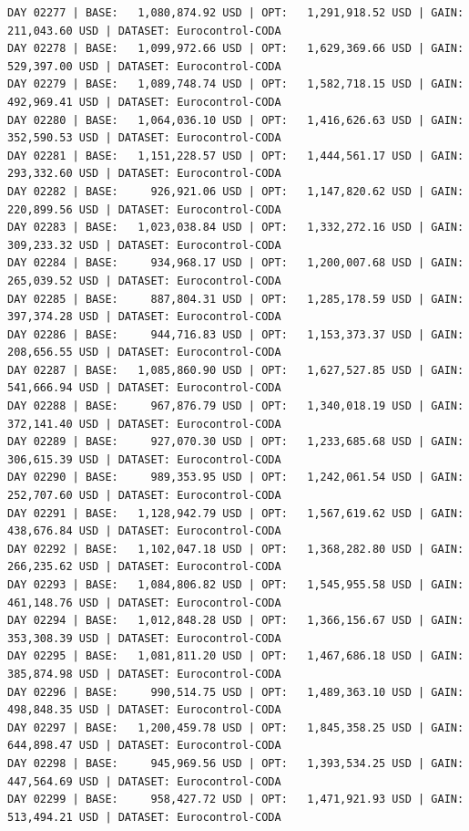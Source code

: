 \documentclass[11pt,a4paper]{article}
\begin{document}
\begin{verbatim}
DAY 02277 | BASE:   1,080,874.92 USD | OPT:   1,291,918.52 USD | GAIN: 211,043.60 USD | DATASET: Eurocontrol-CODA
DAY 02278 | BASE:   1,099,972.66 USD | OPT:   1,629,369.66 USD | GAIN: 529,397.00 USD | DATASET: Eurocontrol-CODA
DAY 02279 | BASE:   1,089,748.74 USD | OPT:   1,582,718.15 USD | GAIN: 492,969.41 USD | DATASET: Eurocontrol-CODA
DAY 02280 | BASE:   1,064,036.10 USD | OPT:   1,416,626.63 USD | GAIN: 352,590.53 USD | DATASET: Eurocontrol-CODA
DAY 02281 | BASE:   1,151,228.57 USD | OPT:   1,444,561.17 USD | GAIN: 293,332.60 USD | DATASET: Eurocontrol-CODA
DAY 02282 | BASE:     926,921.06 USD | OPT:   1,147,820.62 USD | GAIN: 220,899.56 USD | DATASET: Eurocontrol-CODA
DAY 02283 | BASE:   1,023,038.84 USD | OPT:   1,332,272.16 USD | GAIN: 309,233.32 USD | DATASET: Eurocontrol-CODA
DAY 02284 | BASE:     934,968.17 USD | OPT:   1,200,007.68 USD | GAIN: 265,039.52 USD | DATASET: Eurocontrol-CODA
DAY 02285 | BASE:     887,804.31 USD | OPT:   1,285,178.59 USD | GAIN: 397,374.28 USD | DATASET: Eurocontrol-CODA
DAY 02286 | BASE:     944,716.83 USD | OPT:   1,153,373.37 USD | GAIN: 208,656.55 USD | DATASET: Eurocontrol-CODA
DAY 02287 | BASE:   1,085,860.90 USD | OPT:   1,627,527.85 USD | GAIN: 541,666.94 USD | DATASET: Eurocontrol-CODA
DAY 02288 | BASE:     967,876.79 USD | OPT:   1,340,018.19 USD | GAIN: 372,141.40 USD | DATASET: Eurocontrol-CODA
DAY 02289 | BASE:     927,070.30 USD | OPT:   1,233,685.68 USD | GAIN: 306,615.39 USD | DATASET: Eurocontrol-CODA
DAY 02290 | BASE:     989,353.95 USD | OPT:   1,242,061.54 USD | GAIN: 252,707.60 USD | DATASET: Eurocontrol-CODA
DAY 02291 | BASE:   1,128,942.79 USD | OPT:   1,567,619.62 USD | GAIN: 438,676.84 USD | DATASET: Eurocontrol-CODA
DAY 02292 | BASE:   1,102,047.18 USD | OPT:   1,368,282.80 USD | GAIN: 266,235.62 USD | DATASET: Eurocontrol-CODA
DAY 02293 | BASE:   1,084,806.82 USD | OPT:   1,545,955.58 USD | GAIN: 461,148.76 USD | DATASET: Eurocontrol-CODA
DAY 02294 | BASE:   1,012,848.28 USD | OPT:   1,366,156.67 USD | GAIN: 353,308.39 USD | DATASET: Eurocontrol-CODA
DAY 02295 | BASE:   1,081,811.20 USD | OPT:   1,467,686.18 USD | GAIN: 385,874.98 USD | DATASET: Eurocontrol-CODA
DAY 02296 | BASE:     990,514.75 USD | OPT:   1,489,363.10 USD | GAIN: 498,848.35 USD | DATASET: Eurocontrol-CODA
DAY 02297 | BASE:   1,200,459.78 USD | OPT:   1,845,358.25 USD | GAIN: 644,898.47 USD | DATASET: Eurocontrol-CODA
DAY 02298 | BASE:     945,969.56 USD | OPT:   1,393,534.25 USD | GAIN: 447,564.69 USD | DATASET: Eurocontrol-CODA
DAY 02299 | BASE:     958,427.72 USD | OPT:   1,471,921.93 USD | GAIN: 513,494.21 USD | DATASET: Eurocontrol-CODA

\end{verbatim}
\end{document}
